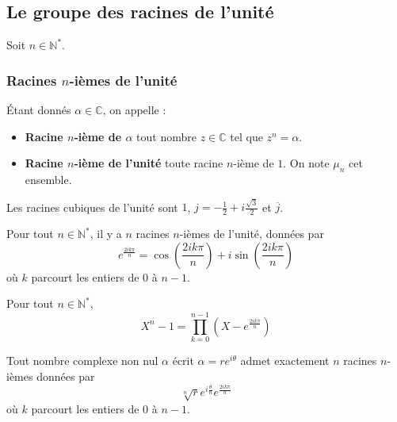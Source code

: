   \subsection{Le groupe des racines de l'unité}

  Soit $n \in \mathbb{N}^*$.

  \subsubsection{Racines \texorpdfstring{$n$}{n}-ièmes de l'unité}


  \begin{definition}
    Étant donnés $\alpha \in \mathbb{C}$, on appelle :
    \begin{itemize}
      \item \textbf{Racine $n$-ième de $\alpha$} tout nombre $z \in \mathbb{C}$ tel que $z^n = \alpha$.
      \item \textbf{Racine $n$-ième de l'unité} toute racine $n$-ième de $1$. On note $\mu_n$ cet ensemble.
    \end{itemize}
  \end{definition}

  \begin{example}
    Les racines cubiques de l'unité sont $1$, $j = -\frac{1}{2} +i\frac{\sqrt{3}}{2}$ et $\overline{j}$.
  \end{example}

  \begin{proposition}
    Pour tout $n \in \mathbb{N}^*$, il y a $n$ racines $n$-ièmes de l'unité, données par
    \[ e^{\frac{2ik\pi}{n}} = \cos \left( \frac{2ik\pi}{n} \right) + i \sin \left( \frac{2ik\pi}{n} \right) \]
    où $k$ parcourt les entiers de $0$ à $n-1$.
  \end{proposition}

  \begin{corollary}
    Pour tout $n \in \mathbb{N}^*$,
    \[ X^n - 1 = \prod_{k=0}^{n-1} (X - e^{\frac{2ik\pi}{n}}) \]
  \end{corollary}

  \begin{corollary}
    Tout nombre complexe non nul $\alpha$ écrit $\alpha = re^{i\theta}$ admet exactement $n$ racines $n$-ièmes données par
    \[ \sqrt[n]{r} e^{i\frac{\theta}{n}} e^{\frac{2ik\pi}{n}} \]
    où $k$ parcourt les entiers de $0$ à $n-1$.
  \end{corollary}


